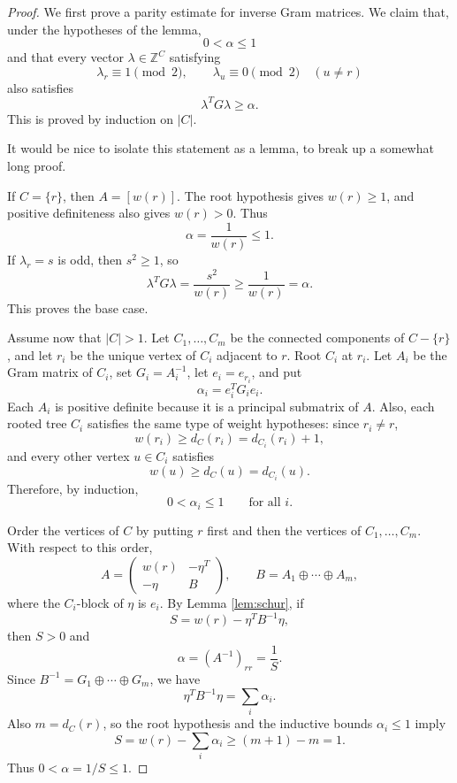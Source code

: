\documentclass[12pt]{article}
\newcommand{\Z}{\mathbb{Z}}
\newcommand{\review}[1]{\begin{reviewbox}#1\end{reviewbox}}
\begin{document}
\begin{proof}
We first prove a parity estimate for inverse Gram matrices. We claim that, under the hypotheses of the lemma,
\[
0<\alpha\le 1
\]
and that every vector \(\lambda\in\Z^C\) satisfying
\[
\lambda_r\equiv 1\pmod 2,
\qquad
\lambda_u\equiv 0\pmod 2\quad(u\ne r)
\]
also satisfies
\[
\lambda^T G\lambda\ge \alpha.
\]
This is proved by induction on \(|C|\).
\review{It would be nice to isolate this statement as a lemma, to break up a somewhat long proof.}

If \(C=\{r\}\), then \(A=[w(r)]\). The root hypothesis gives \(w(r)\ge 1\), and positive definiteness also gives \(w(r)>0\). Thus
\[
\alpha=\frac{1}{w(r)}\le 1.
\]
If \(\lambda_r=s\) is odd, then \(s^2\ge 1\), so
\[
\lambda^TG\lambda=\frac{s^2}{w(r)}\ge \frac{1}{w(r)}=\alpha.
\]
This proves the base case.

Assume now that \(|C|>1\). Let \(C_1,\dots,C_m\) be the connected components of \(C-\{r\}\), and let \(r_i\) be the unique vertex of \(C_i\) adjacent to \(r\). Root \(C_i\) at \(r_i\). Let \(A_i\) be the Gram matrix of \(C_i\), set \(G_i=A_i^{-1}\), let \(e_i=e_{r_i}\), and put
\[
\alpha_i=e_i^TG_ie_i.
\]
Each \(A_i\) is positive definite because it is a principal submatrix of \(A\). Also, each rooted tree \(C_i\) satisfies the same type of weight hypotheses: since \(r_i\ne r\),
\[
w(r_i)\ge d_C(r_i)=d_{C_i}(r_i)+1,
\]
and every other vertex \(u\in C_i\) satisfies
\[
w(u)\ge d_C(u)=d_{C_i}(u).
\]
Therefore, by induction,
\[
0<\alpha_i\le 1
\qquad\text{for all }i.
\]

Order the vertices of \(C\) by putting \(r\) first and then the vertices of \(C_1,\dots,C_m\). With respect to this order,
\[
A=
\begin{pmatrix}
w(r) & -\eta^T\\
-\eta & B
\end{pmatrix},
\qquad
B=A_1\oplus\cdots\oplus A_m,
\]
where the \(C_i\)-block of \(\eta\) is \(e_i\). By Lemma \ref{lem:schur}, if
\[
S=w(r)-\eta^TB^{-1}\eta,
\]
then \(S>0\) and
\[
\alpha=(A^{-1})_{rr}=\frac{1}{S}.
\]
Since \(B^{-1}=G_1\oplus\cdots\oplus G_m\), we have
\[
\eta^TB^{-1}\eta=\sum_i \alpha_i.
\]
Also \(m=d_C(r)\), so the root hypothesis and the inductive bounds \(\alpha_i\le 1\) imply
\[
S=w(r)-\sum_i\alpha_i
\ge (m+1)-m
=1.
\]
Thus \(0<\alpha=1/S\le 1\).


\end{proof}
\end{document}
